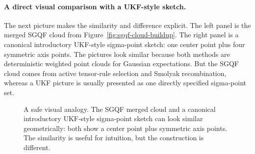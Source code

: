 \documentclass[11pt]{article}
\begin{document}
\paragraph{A direct visual comparison with a UKF-style sketch.}
The next picture makes the similarity and difference explicit.  The left panel is
the merged SGQF cloud from Figure~\ref{fig:sgqf-cloud-buildup}.  The right panel
is a canonical introductory UKF-style sigma-point sketch: one center point plus
four symmetric axis points.  The pictures look similar because both methods are
deterministic weighted point clouds for Gaussian expectations.  But the SGQF
cloud comes from active tensor-rule selection and Smolyak recombination, whereas
a UKF picture is usually presented as one directly specified sigma-point set.

\begin{figure}[htbp]
\centering
{}
\caption{A safe visual analogy.  The SGQF merged cloud and a canonical
introductory UKF-style sigma-point sketch can look similar geometrically: both
show a center point plus symmetric axis points.  The similarity is useful for
intuition, but the construction is different.}
\label{fig:sgqf-vs-ukf-2d}
\end{figure}
\end{document}
